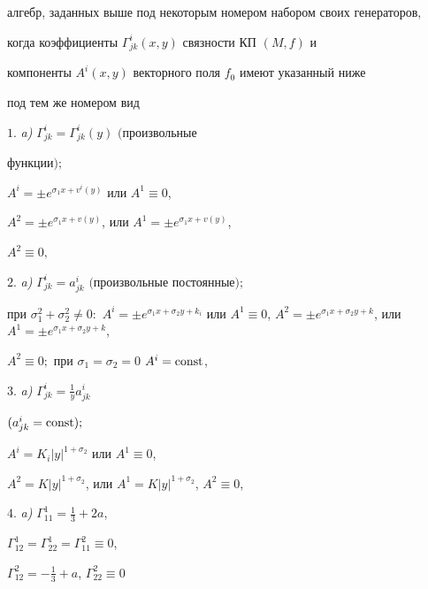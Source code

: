 \begin{thm}
алгебр, заданных выше под некоторым номером набором своих генераторов, 


когда коэффициенты $\Gamma^i_{j k}(x,y)$ связности КП $(M,f)$ и 


компоненты $A^i(x,y)$ векторного поля $f_0$ имеют указанный ниже 


под тем же номером вид 


 


$1.$ {\em a)} $\Gamma^i_{j k}=\Gamma^i_{j k}(y)$ $($произвольные 


функции$);$ 


 


 $A^i=\pm e^{\sigma_1x+v^i(y)}$ или $A^1\equiv0$, 


$A^2=\pm e^{\sigma_1x+v(y)}$, или $A^1=\pm e^{\sigma_1x+v(y)}$, 


$A^2\equiv0,$ 


 


$2.$ {\em a)} $\Gamma^i_{j k}=a^i_{j k}$ $($произвольные постоянные$);$ 


 


 при $\sigma^2_1+\sigma^2_2\ne0:$ $A^i=\pm 


e^{\sigma_1x+\sigma_2y+k_i}$ или $A^1\equiv0$, $A^2=\pm 


e^{\sigma_1x+\sigma_2y+k}$, или $A^1=\pm e^{\sigma_1x+\sigma_2y+k}$, 


$A^2\equiv0;$ при $\sigma_1=\sigma_2=0$\; $A^i=\operatorname{const}$, 


 


$3.$ {\em a)} $\Gamma^i_{j k}=\frac{1}{y}a^i_{j k}$ 


$(a^i_{j k}=\operatorname{const});$ 


 


 $A^i=K_i|y|^{1+\sigma_2}$ или $A^1\equiv0$, 


$A^2=K|y|^{1+\sigma_2}$, или $A^1=K|y|^{1+\sigma_2}$, $A^2\equiv0$, 


 


$4.$ {\em a)} $\Gamma^1_{11}=\frac{1}{3}+2a$, 


$\Gamma^1_{12}=\Gamma^1_{22}=\Gamma^2_{11}\equiv0$, 


$\Gamma^2_{12}=-\frac{1}{3}+a$, $\Gamma^2_{22}\equiv0$ 



\end{thm}
